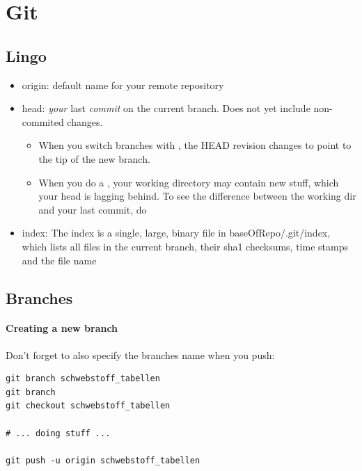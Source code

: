 \section{Git}

\subsection{Lingo}
\begin{itemize}

    \item origin: default name for your remote repository
    
    \item head: \emph{your} last \emph{commit} on the current branch. Does not yet include non-commited changes. 
        \begin{itemize}
            \item When you switch branches with , the HEAD revision changes to point to the tip of the new
            branch.
            \item When you do a , your working directory may contain new stuff, which your head is lagging behind. To see the difference between the working dir and your last commit, do 
        \end{itemize}
        
    \item index: The index is a single, large, binary file in baseOfRepo/.git/index, which lists all files in the current branch, their sha1 checksums, time stamps and the file name
    
\end{itemize}

\subsection{Branches}

\paragraph{Creating a new branch} Don't forget to also specify the branches name when you push:

\begin{lstlisting}
git branch schwebstoff_tabellen
git branch
git checkout schwebstoff_tabellen

# ... doing stuff ...

git push -u origin schwebstoff_tabellen
\end{lstlisting}

